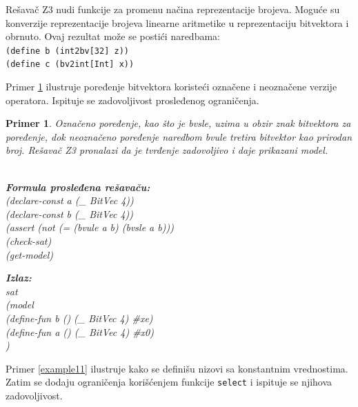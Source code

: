 \documentclass[12pt,oneside]{memoir}
\newcommand\tab[1][0.5cm]{\hspace*{#1}}
\newtheorem{primer}{Primer}
\begin{document}
Rešavač Z3 nudi funkcije za promenu načina reprezentacije brojeva. Moguće su konverzije reprezentacije brojeva linearne aritmetike u reprezentaciju bitvektora i obrnuto. Ovaj rezultat može se postići naredbama: \\
\texttt{(define b (int2bv[32] z))} \\  
\texttt{(define c (bv2int[Int] x))}
\par
Primer \ref{example10} ilustruje poređenje bitvektora koristeći označene i neoznačene verzije operatora. Ispituje se zadovoljivost prosleđenog ograničenja.
\begin{primer} \label{example10} Označeno poređenje, kao što je bvsle, uzima u obzir znak bitvektora za poređenje, dok neoznačeno poređenje naredbom bvule tretira bitvektor kao prirodan broj. Rešavač Z3 pronalazi da je tvrđenje zadovoljivo i daje prikazani model.
\\ \\
\begin{minipage}[b]{0.5\textwidth}
\textbf{Formula prosleđena rešavaču:}
\\(declare-const a (\_ BitVec 4))
\\(declare-const b (\_ BitVec 4))
\\(assert (not (= (bvule a b) (bvsle a b)))
\\(check-sat)
\\(get-model)
\end{minipage}
\hspace{1.15cm} 
\begin{minipage}[t]{0.5\textwidth}
\vspace{-3.45cm}
\textbf{Izlaz:}
\\sat 
\\(model 
\\\tab(define-fun b () (\_ BitVec 4) \#xe) 
\\\tab(define-fun a () (\_ BitVec 4) \#x0)
\\)
\end{minipage}
\end{primer}
\par
Primer \ref{example11} ilustruje kako se definišu nizovi sa konstantnim vrednostima. Zatim se dodaju ograničenja korišćenjem funkcije \texttt{select} i ispituje se njihova zadovoljivost.
\end{document}
